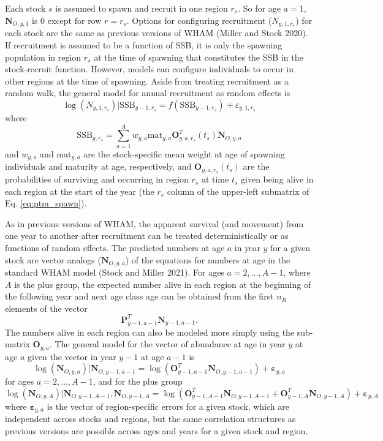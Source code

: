 \documentclass[
]{article}
\begin{document}
Each stock \(s\) is assumed to spawn and recruit in one region \(r_s\). So for age \(a=1\), \(\mathbf{N}_{O,y,1}\) is 0 except for row \(r = r_s\). Options for configuring recruitment (\(N_{y,1,r_s}\)) for each stock are the same as previous versions of WHAM (Miller and Stock 2020). If recruitment is assumed to be a function of SSB, it is only the spawning population in region \(r_s\) at the time of spawning that constitutes the SSB in the stock-recruit function. However, models can configure individuals to occur in other regions at the time of spawning. Aside from treating recruitment as a random walk, the general model for annual recruitment as random effects is
\begin{equation*}
\log\left(N_{y,1,r_s}\right)|\text{SSB}_{y-1,r_s} =  f\left(\text{SSB}_{y-1,r_s}\right) + \varepsilon_{y,1,r_s}
\end{equation*}
where\\
\[\text{SSB}_{y,r_s} =  \sum^A_{a=1}  w_{y,a} \text{mat}_{y,a} \mathbf{O}_{y,a,r_s}^T(t_s) \mathbf{N}_{O,y,a}\]
and \(w_{y,a}\) and \(\text{mat}_{y,a}\) are the stock-specific mean weight at age of spawning individuals and maturity at age, respectively, and \(\mathbf{O}_{y,a,r_s}(t_s)\) are the probabilities of surviving and occurring in region \(r_s\) at time \(t_s\) given being alive in each region at the start of the year (the \(r_s\) column of the upper-left submatrix of Eq. \ref{eq:ptm_spawn}).

As in previous versions of WHAM, the apparent survival (and movement) from one year to another after recruitment can be treated deterministically or as functions of random effects. The predicted numbers at age \(a\) in year \(y\) for a given stock are vector analogs (\(\mathbf{N}_{O,y,a}\)) of the equations for numbers at age in the standard WHAM model (Stock and Miller 2021). For ages \(a = 2,\ldots, A-1\), where \(A\) is the plus group, the expected number alive in each region at the beginning of the following year and next age class age can be obtained from the first \(n_R\) elements of the vector
\[\mathbf{P}_{y-1,a-1}^T \mathbf{N}_{y-1,a-1}.\]
The numbers alive in each region can also be modeled more simply using the sub-matrix \(\mathbf{O}_{y,a}\). The general model for the vector of abundance at age in year \(y\) at age \(a\) given the vector in year \(y-1\) at age \(a-1\) is
\begin{equation*}
\log\left(\mathbf{N}_{O,y,a}\right)|\mathbf{N}_{O,y-1,a-1} =  \log\left(\mathbf{O}_{y-1,a-1}^T \mathbf{N}_{O,y-1,a-1}\right) + \boldsymbol{\varepsilon}_{y,a}
\end{equation*}
for ages \(a = 2,\ldots, A-1\), and for the plus group
\begin{equation*}
\log\left(\mathbf{N}_{O,y,A}\right)|\mathbf{N}_{O,y-1,A-1},\mathbf{N}_{O,y-1,A} = \log\left(\mathbf{O}_{y-1,A-1}^T \mathbf{N}_{O,y-1,A-1} + \mathbf{O}_{y-1,A}^T \mathbf{N}_{O,y-1,A}\right) + \boldsymbol{\varepsilon}_{y,A}
\end{equation*}
where \(\boldsymbol{\varepsilon}_{y,a}\) is the vector of region-specific errors for a given stock, which are independent across stocks and regions, but the same correlation structures as previous versions are possible across ages and years for a given stock and region.
\end{document}
